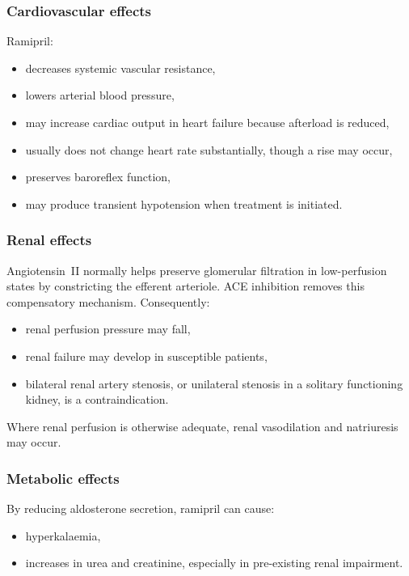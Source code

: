 \documentclass[11pt,a4paper]{article}
\begin{document}
\subsubsection{Cardiovascular effects}

Ramipril:
\begin{itemize}
    \item decreases systemic vascular resistance,
    \item lowers arterial blood pressure,
    \item may increase cardiac output in heart failure because afterload is reduced,
    \item usually does not change heart rate substantially, though a rise may occur,
    \item preserves baroreflex function,
    \item may produce transient hypotension when treatment is initiated.
\end{itemize}

\subsubsection{Renal effects}

Angiotensin~II normally helps preserve glomerular filtration in low-perfusion states by constricting the efferent arteriole. ACE inhibition removes this compensatory mechanism. Consequently:
\begin{itemize}
    \item renal perfusion pressure may fall,
    \item renal failure may develop in susceptible patients,
    \item bilateral renal artery stenosis, or unilateral stenosis in a solitary functioning kidney, is a contraindication.
\end{itemize}

Where renal perfusion is otherwise adequate, renal vasodilation and natriuresis may occur.

\subsubsection{Metabolic effects}

By reducing aldosterone secretion, ramipril can cause:
\begin{itemize}
    \item hyperkalaemia,
    \item increases in urea and creatinine, especially in pre-existing renal impairment.
\end{itemize}
\end{document}
